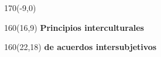 \documentclass[shownotes,aspectratio=169]{beamer}
\begin{document}
\begin{frame}
\begin{textblock}{170}(-9,0)
\end{textblock}


\begin{textblock}{160}(16,9)
\LARGE \textcolor{black!15}{\fontsize{22}{0}\selectfont \textbf{Principios interculturales}}
\end{textblock}
\begin{textblock}{160}(22,18)
\LARGE \textcolor{black!15}{\fontsize{22}{0}\selectfont \textbf{de acuerdos intersubjetivos}}
\end{textblock}

\end{frame}
\end{document}
